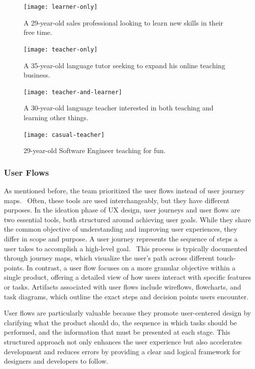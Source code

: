 \begin{figure}[h]
    \centering
    \texttt{[image: learner-only]}
    \caption{A 29-year-old sales professional looking to learn new skills in their free time.}
    \label{fig:figure14}
\end{figure}
\begin{figure}[t]
    \centering
    \texttt{[image: teacher-only]}
    \caption{A 35-year-old language tutor seeking to expand his online teaching business.}
    \label{fig:figure15}
\end{figure}
\begin{figure}[h]
    \centering
    \texttt{[image: teacher-and-learner]}
    \caption{A 30-year-old language teacher interested in both teaching and learning other things.}
    \label{fig:figure16}
\end{figure}
\begin{figure}[b]
    \centering
    \texttt{[image: casual-teacher]}
    \caption{ 29-year-old Software Engineer teaching for fun.}
    \label{fig:figure17}
\end{figure}

\clearpage

\subsubsection{User Flows}\label{subsubsec:user-flows}

As mentioned before, the team prioritized the user flows instead of user journey maps. \ Often, these tools are used interchangeably, but they have different purposes.
In the ideation phase of UX design, user journeys and user flows are two essential tools, both structured around achieving user goals.
While they share the common objective of understanding and improving user experiences, they differ in scope and purpose.
A user journey represents the sequence of steps a user takes to accomplish a high-level goal. \ This process is typically documented through journey maps, which visualize the user's path across different touch-points.
In contrast, a user flow focuses on a more granular objective within a single product, offering a detailed view of how users interact with specific features or tasks.
Artifacts associated with user flows include wireflows, flowcharts, and task diagrams, which outline the exact steps and decision points users encounter.

User flows are particularly valuable because they promote user-centered design by clarifying what the product should do, the sequence in which tasks should be performed, and the information that must be presented at each stage.
This structured approach not only enhances the user experience but also accelerates development and reduces errors by providing a clear and logical framework for designers and developers to follow.\cite[User Journeys vs User Flows]{userJourneys}

